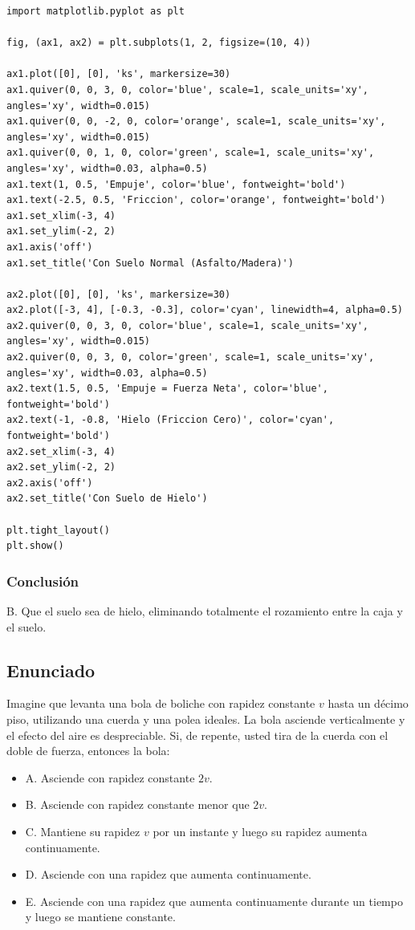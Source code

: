 \documentclass[12pt, a4paper]{article}
\begin{document}
\begin{lstlisting}
import matplotlib.pyplot as plt

fig, (ax1, ax2) = plt.subplots(1, 2, figsize=(10, 4))

ax1.plot([0], [0], 'ks', markersize=30)
ax1.quiver(0, 0, 3, 0, color='blue', scale=1, scale_units='xy', angles='xy', width=0.015)
ax1.quiver(0, 0, -2, 0, color='orange', scale=1, scale_units='xy', angles='xy', width=0.015)
ax1.quiver(0, 0, 1, 0, color='green', scale=1, scale_units='xy', angles='xy', width=0.03, alpha=0.5)
ax1.text(1, 0.5, 'Empuje', color='blue', fontweight='bold')
ax1.text(-2.5, 0.5, 'Friccion', color='orange', fontweight='bold')
ax1.set_xlim(-3, 4)
ax1.set_ylim(-2, 2)
ax1.axis('off')
ax1.set_title('Con Suelo Normal (Asfalto/Madera)')

ax2.plot([0], [0], 'ks', markersize=30)
ax2.plot([-3, 4], [-0.3, -0.3], color='cyan', linewidth=4, alpha=0.5)
ax2.quiver(0, 0, 3, 0, color='blue', scale=1, scale_units='xy', angles='xy', width=0.015)
ax2.quiver(0, 0, 3, 0, color='green', scale=1, scale_units='xy', angles='xy', width=0.03, alpha=0.5)
ax2.text(1.5, 0.5, 'Empuje = Fuerza Neta', color='blue', fontweight='bold')
ax2.text(-1, -0.8, 'Hielo (Friccion Cero)', color='cyan', fontweight='bold')
ax2.set_xlim(-3, 4)
ax2.set_ylim(-2, 2)
ax2.axis('off')
ax2.set_title('Con Suelo de Hielo')

plt.tight_layout()
plt.show()
\end{lstlisting}

\subsubsection*{Conclusión}

B. Que el suelo sea de hielo, eliminando totalmente el rozamiento entre la caja y el suelo.

\newpage

\subsection*{Enunciado}

Imagine que levanta una bola de boliche con rapidez constante $v$ hasta un décimo piso, utilizando una cuerda y una polea ideales. La bola asciende verticalmente y el efecto del aire es despreciable. Si, de repente, usted tira de la cuerda con el doble de fuerza, entonces la bola:

\begin{itemize}
    \item A. Asciende con rapidez constante $2v$.
    \item B. Asciende con rapidez constante menor que $2v$.
    \item C. Mantiene su rapidez $v$ por un instante y luego su rapidez aumenta continuamente.
    \item D. Asciende con una rapidez que aumenta continuamente.
    \item E. Asciende con una rapidez que aumenta continuamente durante un tiempo y luego se mantiene constante.
\end{itemize}
\end{document}
